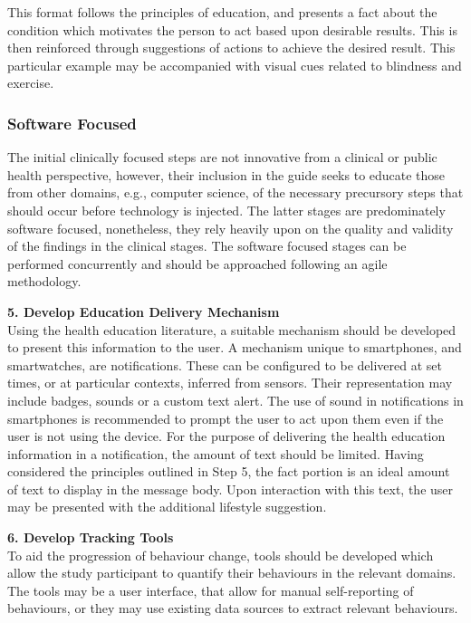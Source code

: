 This format follows the principles of education, and presents a fact about the condition which motivates the person to act based upon desirable results. This is then reinforced through suggestions of actions to achieve the desired result. This particular example may be accompanied with visual cues related to blindness and exercise.

\subsubsection{Software Focused}
The initial clinically focused steps are not innovative from a clinical or public health perspective, however, their inclusion in the guide seeks to educate those from other domains, e.g., computer science, of the necessary precursory steps that should occur before technology is injected. The latter stages are predominately software focused, nonetheless, they rely heavily upon on the quality and validity of the findings in the clinical stages. The software focused stages can be performed concurrently and should be approached following an agile methodology.

\textbf{5. Develop Education Delivery Mechanism}\\
Using the health education literature, a suitable mechanism should be developed to present this information to the user. A mechanism unique to smartphones, and smartwatches, are notifications. These can be configured to be delivered at set times, or at particular contexts, inferred from sensors. Their representation may include badges, sounds or a custom text alert.
The use of sound in notifications in smartphones is recommended to prompt the user to act upon them \cite{AppleNotifications2015} even if the user is not using the device. For the purpose of delivering the health education information in a notification, the amount of text should be limited. Having considered the principles outlined in Step 5, the fact portion is an ideal amount of text to display in the message body. Upon interaction with this text, the user may be presented with the additional lifestyle suggestion.

\textbf{6. Develop Tracking Tools} \\
To aid the progression of behaviour change, tools should be developed which allow the study participant to quantify their behaviours in the relevant domains. The tools may be a user interface, that allow for manual self-reporting of behaviours, or they may use existing data sources to extract relevant behaviours.

